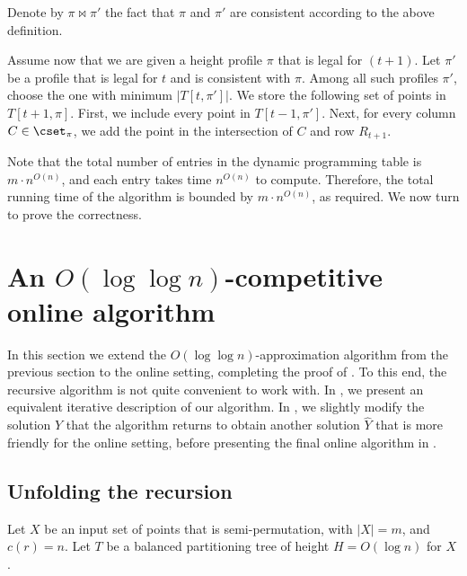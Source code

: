 Denote by $\pi \bowtie \pi'$ the fact that $\pi$ and $\pi'$ are consistent according to the above definition. 


Assume now that we are given a height profile $\pi$ that is legal for $(t+1)$. 
Let $\pi'$ be a profile that is legal for $t$ and is consistent with $\pi$. Among all such profiles $\pi'$, choose the one with minimum $|T[t,\pi']|$. We store the following set of points in $T[t+1,\pi]$. First, we include every point in $T[t-1,\pi']$. Next, for every column $C\in \cset_{\pi}$, we add the point in the intersection of $C$ and row $R_{t+1}$.

Note that the total number of entries in the dynamic programming table is $m\cdot n^{O(n)}$, and each entry takes time $n^{O(n)}$ to compute. Therefore, the total running time of the algorithm is bounded by $m\cdot n^{O(n)}$, as required. We now turn to prove the correctness.
\fi


%

\newcommand{\first}{{\sf first}} 

\newcommand{\last}{{\sf last}} 


\newcommand{\proj}{{\sf proj}} 

\section{An $O(\log \log n)$-competitive online algorithm}  
\label{sec: online}

In this section we extend the $O(\log\log n)$-approximation algorithm from the previous section to the online setting, completing the proof of . To this end, the recursive algorithm is not quite convenient to work with. In , we present an equivalent iterative description of our algorithm. In , we slightly modify the solution $Y$ that the algorithm returns to obtain another solution $\hat{Y}$ that is more friendly for the online setting, before presenting the final online algorithm in .


\subsection{Unfolding the recursion} 
\label{subsec: unfold}  
 
Let $X$ be an input set of points that is semi-permutation, with $|X|=m$, and $c(r)=n$. Let $T$ be a balanced partitioning tree of height $H=O(\log n)$ for $X$. %

